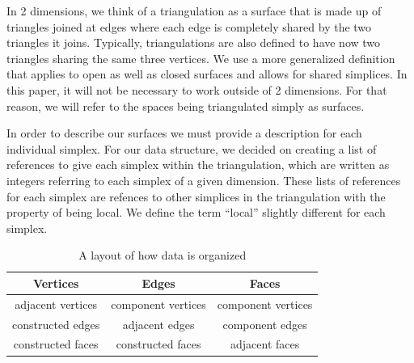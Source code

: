 \documentclass[12pt]{article}
\begin{document}
\noindent In 2 dimensions, we think of a triangulation as a surface that is made up of triangles joined at edges where each edge is completely shared by the two triangles it joins. Typically, triangulations are also defined to have now two triangles sharing the same three vertices. We use a more generalized definition that applies to open as well as closed surfaces and allows for shared simplices. In this paper, it will not be necessary to work outside of 2 dimensions. For that reason, we will refer to the spaces being triangulated simply as surfaces.\newline

\noindent In order to describe our surfaces we must provide a description for each individual simplex. For our data structure, we decided on creating a list of references to give each simplex within the triangulation, which are written as integers referring to each simplex of a given dimension. These lists of references for each simplex are refences to other simplices in the triangulation with the property of being local. We define the term ``local'' slightly different for each simplex.\newline

  \begin{table}%
  \begin{center}
  \begin{tabular}{|c|c|c|}
  \hline
  Vertices & Edges & Faces\\
  \hline
  adjacent vertices & component vertices & component vertices\\
  constructed edges & adjacent edges & component edges\\
  constructed faces & constructed faces & adjacent faces\\
  \hline
  \end{tabular}
  \end{center}
  \caption{A layout of how data is organized}
  \label{geomat}
  \end{table}
\end{document}
